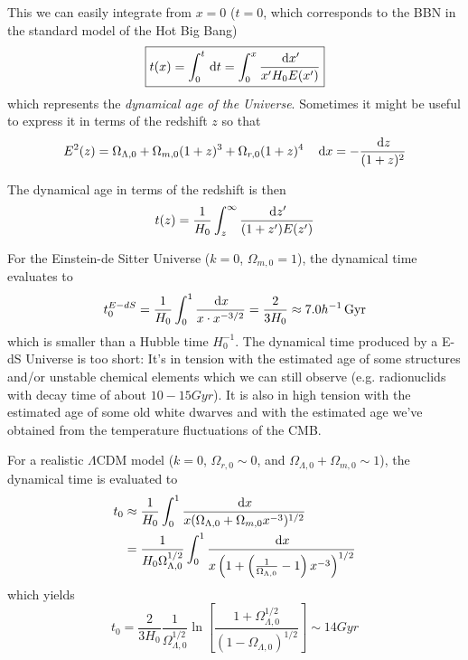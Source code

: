 This we can easily integrate from $x=0$ ($t=0$, which corresponds to the BBN in the standard model of the Hot Big Bang)
\begin{equation}
    \boxed{
    t(x) = \int_{0}^{t}\,\text{d}t = \int_{0}^{x} \frac{\,\text{d}x'}{x'H_{0}E(x')}
    }
    \label{eq:dynamicalage}
\end{equation}
which represents the \emph{dynamical age of the Universe}. Sometimes it might be useful to express it in terms of the redshift $z$ so that
\begin{equation}
    E^{2}(z) = \Omega_{\Lambda,0} + \Omega_{m,0}(1+z)^{3} + \Omega_{r,0}(1+z)^{4} \quad \,\text{d}x = -\frac{\,\text{d}z}{(1+z)^{2}}
\end{equation}
\par The dynamical age in terms of the redshift is then
\begin{equation}
    t(z) = \frac{1}{H_{0}}\int_{z}^{\infty} \frac{\,\text{d}z'}{(1+z')E(z')}
\end{equation}
\par For the Einstein-de Sitter Universe ($k=0$, $\Omega_{m,0}=1$), the dynamical time evaluates to 
\begin{equation}
    t_{0}^{E-dS} = \frac{1}{H_{0}}\int_{0}^{1}\frac{\,\text{d}x}{x\cdot x^{-3/2}} = \frac{2}{3H_{0}} \approx 7.0h^{-1}\,\text{Gyr}
\end{equation}
which is smaller than a Hubble time $H_{0}^{-1}$. The dynamical time produced by a E-dS Universe is too short: It's in tension with the estimated age of some structures and/or unstable chemical elements which we can still observe (e.g. radionuclids with decay time of about $10-15\unit{Gyr}$). It is also in high tension with the estimated age of some old white dwarves and with the estimated age we've obtained from the temperature fluctuations of the CMB.
\par For a realistic $\Lambda$CDM model ($k=0$, $\Omega_{r,0}\sim 0$, and $\Omega_{\Lambda,0}+\Omega_{m,0}\sim 1$), the dynamical time is evaluated to
\begin{align*}
    t_{0} &\approx \frac{1}{H_{0}}\int_{0}^{1}\frac{\,\text{d}x}{x(\Omega_{\Lambda,0}+\Omega_{m,0}x^{-3})^{1/2}}\\
    &= \frac{1}{H_{0}\Omega_{\Lambda,0}^{1/2}}\int_{0}^{1}\frac{\,\text{d}x}{x \left(1+\left(\frac{1}{\Omega_{\Lambda,0}}-1\right)x^{-3}\right)^{1/2}}
\end{align*}
which yields
\begin{equation}
    t_{0} = \frac{2}{3H_{0}}\frac{1}{\Omega_{\Lambda,0}^{1/2}}\ln\left[\frac{1+\Omega_{\Lambda,0}^{1/2}}{(1-\Omega_{\Lambda,0})^{1/2}}\right] \sim 14\unit{Gyr}
\end{equation}